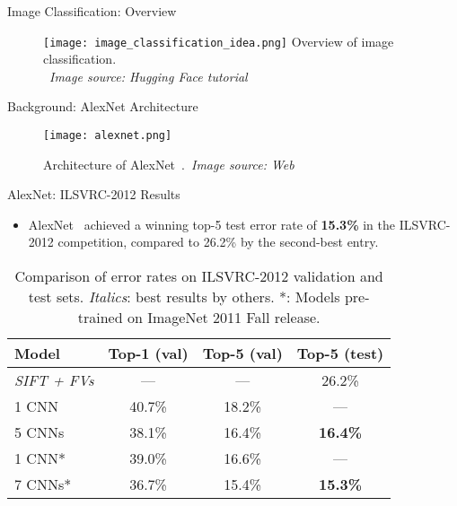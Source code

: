 \begin{refsection}
  \begin{frame}{Image Classification: Overview}
    \begin{figure}
      \centering
      \texttt{[image: image\_classification\_idea.png]}
      {\scriptsize Overview of image classification.\\\ \textit{Image source: Hugging Face tutorial}}
    \end{figure}
    \bottomleftrefs
  \end{frame}
\end{refsection}

\begin{refsection}
  \begin{frame}{Background: AlexNet Architecture}
    \begin{figure}
      \centering
      \texttt{[image: alexnet.png]}
      \caption[]{\scriptsize Architecture of AlexNet~\parencite{krizhevskyImageNetClassificationDeep2012}.~\textit{Image source: Web}}
    \end{figure}
    \bottomleftrefs
  \end{frame}
\end{refsection}

\begin{refsection}
  \begin{frame}{AlexNet: ILSVRC-2012 Results}
    \begin{itemize}
      \item AlexNet~\parencite{krizhevskyImageNetClassificationDeep2012} achieved a winning top-5 test error rate of \textbf{15.3\%} in the ILSVRC-2012 competition, compared to 26.2\% by the second-best entry.
    \end{itemize}
    \vspace{0.5em}
    \begin{table}[h]
      \centering
      \begin{tabular}{|l|c|c|c|}
      \hline
      \textbf{Model} & \textbf{Top-1 (val)} & \textbf{Top-5 (val)} & \textbf{Top-5 (test)} \\
      \hline
      \textit{SIFT + FVs} & --- & --- & 26.2\% \\
      1 CNN & 40.7\% & 18.2\% & --- \\
      5 CNNs & 38.1\% & 16.4\% & \textbf{16.4\%} \\
      1 CNN* & 39.0\% & 16.6\% & --- \\
      7 CNNs* & 36.7\% & 15.4\% & \textbf{15.3\%} \\
      \hline
      \end{tabular}
      \caption{\scriptsize Comparison of error rates on ILSVRC-2012 validation and test sets. \textit{Italics}: best results by others. *: Models pre-trained on ImageNet 2011 Fall release.}
    \end{table}
    \bottomleftrefs
  \end{frame}
\end{refsection}
  

